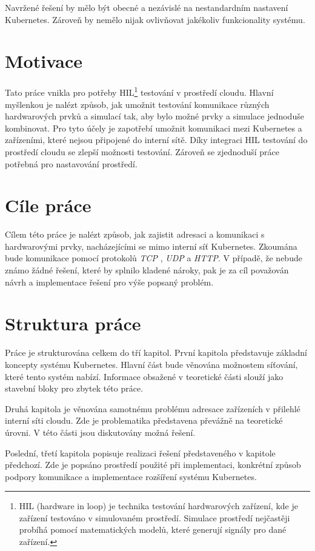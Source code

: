 Navržené řešení by mělo být obecné a nezávislé na nestandardním nastavení Kubernetes. Zároveň by nemělo nijak ovlivňovat jakékoliv funkcionality systému. 

\newpage

\section{Motivace}
Tato práce vnikla pro potřeby HIL\footnote{HIL (hardware in loop) je technika testování hardwarových zařízení, kde je zařízení testováno v simulovaném prostředí. Simulace prostředí nejčastěji probíhá pomocí matematických modelů, které generují signály pro dané zařízení.} testování v prostředí cloudu. Hlavní myšlenkou je nalézt způsob, jak umožnit testování komunikace různých hardwarových prvků a simulací tak, aby bylo možné prvky a simulace jednoduše kombinovat. Pro tyto účely je zapotřebí umožnit komunikaci mezi Kubernetes a zařízeními, které nejsou připojené do interní sítě. Díky integraci HIL testování do prostředí cloudu se zlepší možnosti testování. Zároveň se zjednoduší práce potřebná pro nastavování prostředí.

\section{Cíle práce}
Cílem této práce je nalézt způsob, jak zajistit adresaci a komunikaci s hardwarovými prvky, nacházejícími se mimo interní síť Kubernetes. Zkoumána bude komunikace pomocí protokolů \textit{TCP} , \textit{UDP} a \textit{HTTP}. V případě, že nebude známo žádné řešení, které by splnilo kladené nároky, pak je za cíl považován návrh a implementace řešení pro výše popsaný problém.

\section{Struktura práce}
Práce je strukturována celkem do tří kapitol. První kapitola představuje základní koncepty systému Kubernetes. Hlavní část bude věnována možnostem síťování, které tento systém nabízí. Informace obsažené v teoretické části slouží jako stavební bloky pro zbytek této práce.

Druhá kapitola je věnována samotnému problému adresace zařízeních v přilehlé interní síti cloudu. Zde je problematika představena převážně na teoretické úrovni. V této části jsou diskutovány možná řešení.

Poslední, třetí kapitola popisuje realizaci řešení představeného v kapitole předchozí. Zde je popsáno prostředí použité při implementaci, konkrétní způsob podpory komunikace a implementace rozšíření systému Kubernetes.

